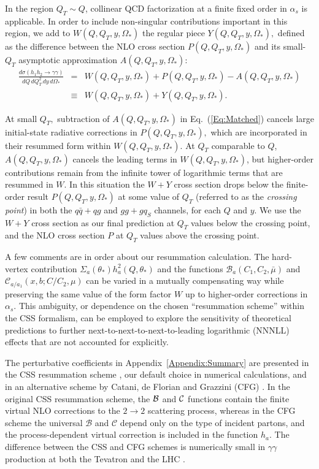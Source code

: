 \documentclass[12pt,english,aps,preprint,prd,letterpaper,fleqn,nofootinbib,showpacs,showkeys,tightenlines,floatfix]{revtex4}
\begin{document}
In the region $Q_{T}\sim Q$, collinear QCD
factorization at a finite fixed order in $\alpha_{s}$ is applicable.
In order to include non-singular contributions important in this region,
we add to $W(Q,Q_{T},y,\Omega_{*})$ the regular piece $Y(Q,Q_{T},y,\Omega_{*}),$
defined as the difference between the NLO cross section $P(Q,Q_{T},y,\Omega_{*})$
and its small-$Q_{T}$ asymptotic approximation $A(Q,Q_{T},y,\Omega_{*})$:\begin{eqnarray}
\frac{d\sigma(h_{1}h_{2}\rightarrow\gamma\gamma)}{dQ\, dQ_{T}^{2}\, dy\, d\Omega_{*}} & = & W(Q,Q_{T},y,\Omega_{*})+P(Q,Q_{T},y,\Omega_{*})-A(Q,Q_{T},y,\Omega_{*})\nonumber \\
 & \equiv & W(Q,Q_{T},y,\Omega_{*})+Y(Q,Q_{T},y,\Omega_{*}).\label{Eq:Matched}\end{eqnarray}


At small $Q_{T},$ subtraction of $A(Q,Q_{T},y,\Omega_{*})$ in
Eq.~(\ref{Eq:Matched}) cancels large initial-state radiative corrections
in $P(Q,Q_{T},y,\Omega_{*}),$ which are incorporated in their resummed
form within $W(Q,Q_{T},y,\Omega_{*})$. At $Q_{T}$ comparable
to $Q$, $A(Q,Q_{T},y,\Omega_{*})$ cancels the leading terms
in $W(Q,Q_{T},y,\Omega_{*})$, but higher-order contributions remain 
from the infinite tower of logarithmic terms that are resummed in 
$W$. In this situation the $W+Y$ cross section drops below
the finite-order result $P(Q,Q_{T},y,\Omega_{*})$ at some value
of $Q_{T}$ (referred to as the {\em crossing point}) in both the
$q\bar{q}+qg$ and $gg+gq_{S}$ channels, for each $Q$ and $y$.
We use the $W+Y$ cross section as our final prediction at $Q_{T}$
values below the crossing point, and the NLO cross section $P$ at
$Q_{T}$ values above the crossing point.

A few comments are in order about our resummation calculation. The
hard-vertex contribution $\Sigma_{a}(\theta_{*})h_{a}^{2}(Q,\theta_{*})$
and the functions $\mathcal{B}_{a}\left(C_{1},C_{2},\bar{\mu}\right)$
and $\mathcal{C}_{a/a_{1}}(x,b;C/C_{2},\mu)$ can be varied in a mutually
compensating way while preserving the same value of the form factor
$W$ up to higher-order corrections in $\alpha_{s}$. This ambiguity,
or dependence on the chosen {}``resummation scheme'' \cite{Catani:2000vq}
within the CSS formalism, can be employed to explore the sensitivity
of theoretical predictions to further next-to-next-to-next-to-leading logarithmic 
(NNNLL) effects that are not accounted for explicitly.

The perturbative coefficients in Appendix~\ref{Appendix:Summary}
are presented in the CSS resummation scheme \cite{Collins:1984kg},
our default choice in numerical calculations, and in an alternative
scheme by Catani, de Florian and Grazzini (CFG) \cite{Catani:2000vq}.
In the original CSS resummation scheme, the ${{\cal B}}$ and ${{\cal C}}$
functions contain the finite virtual NLO corrections to the $2\rightarrow2$
scattering process, whereas in the CFG scheme the universal ${\mathcal{B}}$
and ${\mathcal{C}}$ depend only on the type of incident partons,
and the process-dependent virtual correction is included in the function
$h_{a}$. The difference between the CSS and CFG schemes is numerically
small in $\gamma\gamma$ production at both the Tevatron and the LHC \cite{Nadolsky:2007ba}.
\end{document}
